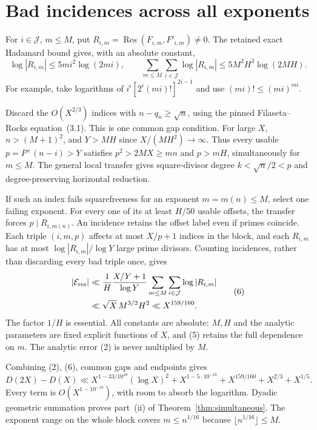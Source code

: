 \documentclass[11pt]{article}
\begin{document}
\section{Bad incidences across all exponents}
For $i\in\mathcal J$, $m\le M$, put
$R_{i,m}=\operatorname{Res}(F_{i,m},F'_{i,m})\ne0$.
The retained exact Hadamard bound gives, with an absolute constant,
\[
 \log|R_{i,m}|\le5mi^2\log(2mi),\qquad
 \sum_{m\le M}\sum_{i\in\mathcal J}\log|R_{i,m}|
 \le5M^2H^3\log(2MH). \tag{5}
\]
For example, take logarithms of
$i^i[2^i(mi)!]^{2i-1}$ and use $(mi)!\le(mi)^{mi}$.

Discard the $O(X^{2/3})$ indices with $n-q_n\ge\sqrt n$, using the pinned
Filaseta--Rocks equation~(3.1). This is one common gap condition.
For large $X$, $n>(M+1)^2$, and $Y>MH$ since
$X/(MH^2)\to\infty$. Thus every usable $p=P^+(n-i)>Y$ satisfies
$p^2>2MX\ge mn$ and $p>mH$, simultaneously for $m\le M$.
The general local transfer gives square-divisor degree
$k<\sqrt n/2<p$ and degree-preserving horizontal reduction.

If such an index fails squarefreeness for an exponent $m=m(n)\le M$,
select one failing exponent. For every one of its at least $H/50$ usable
offsets, the transfer forces $p\mid R_{i,m(n)}$.
An incidence retains the offset label even if primes coincide.
Each triple $(i,m,p)$ affects at most $X/p+1$ indices in the block,
and each $R_{i,m}$ has at most $\log|R_{i,m}|/\log Y$ large prime divisors.
Counting incidences, rather than discarding every bad triple once, gives
\[
 \begin{aligned}
 |\mathcal E_{\rm res}|
 &\ll\frac1H\frac{X/Y+1}{\log Y}
       \sum_{m\le M}\sum_{i\in\mathcal J}\log|R_{i,m}|\\
 &\ll\sqrt X\,M^{3/2}H^2\ll X^{159/160}.
 \end{aligned} \tag{6}
\]
The factor $1/H$ is essential. All constants are absolute: $M,H$ and the
analytic parameters are fixed explicit functions of $X$, and (5) retains
the full dependence on $m$. The analytic error (2) is never multiplied by $M$.

Combining (2), (6), common gaps and endpoints gives
\[
 D(2X)-D(X)\ll X^{1-33/10^{10}}(\log X)^2
 +X^{1-5\cdot10^{-18}}+X^{159/160}+X^{2/3}+X^{1/5}.
\]
Every term is $O(X^{1-10^{-18}})$, with room to absorb the logarithm.
Dyadic geometric summation proves part~(ii) of Theorem~\ref{thm:simultaneous}.
The exponent range on the whole block covers $m\le n^{1/16}$ because
$\lfloor n^{1/16}\rfloor\le M$.
\end{document}

